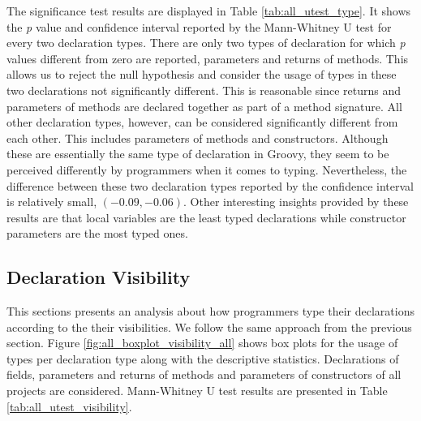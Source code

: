 \documentclass[preprint]{sigplanconf}
\begin{document}
The significance test results are displayed in Table \ref{tab:all_utest_type}.
It shows the \emph{p} value and confidence interval reported by the Mann-Whitney U test for every two declaration types.
There are only two types of declaration for which \emph{p} values different from zero are reported, parameters and returns of methods.
This allows us to reject the null hypothesis and consider the usage of types in these two declarations not significantly different.
This is reasonable since returns and parameters of methods are declared together as part of a method signature.
All other declaration types, however, can be considered significantly different from each other.
This includes parameters of methods and constructors.
Although these are essentially the same type of declaration in Groovy, they seem to be perceived differently by programmers when it comes to typing.
Nevertheless, the difference between these two declaration types reported by the confidence interval is relatively small, $(-0.09, -0.06)$.
Other interesting insights provided by these results are that local variables are the least typed declarations while constructor parameters are the most typed ones.

\subsection{Declaration Visibility\label{sec:results-visibility}}

This sections presents an analysis about how programmers type their declarations according to the their visibilities.
We follow the same approach from the previous section.
Figure \ref{fig:all_boxplot_visibility_all} shows box plots for the usage of types per declaration type along with the descriptive statistics.
Declarations of fields, parameters and returns of methods and parameters of constructors of all projects are considered.
Mann-Whitney U test results are presented in Table \ref{tab:all_utest_visibility}.
\end{document}
